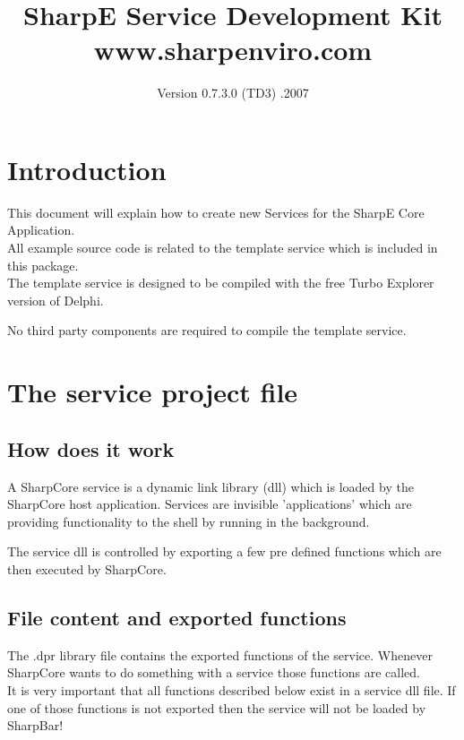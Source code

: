 \documentclass[a4paper]{article}
\begin{document}
\title{ {\bf SharpE} \break \break
{\bf Service Development Kit }\break 
\normalsize www.sharpenviro.com}
\date{Version 0.7.3.0 (TD3) \break {}.2007}
\maketitle
\thispagestyle{empty}
\tableofcontents
\thispagestyle{empty}
\newpage
\setcounter{page}{1}


\section{Introduction}
  This document will explain how to create new Services for the SharpE Core Application.\\
  All example source code is related to the template service which is included in this package.\\
  The template service is designed to be compiled with the free Turbo Explorer version of Delphi.

  \medskip
  No third party components are required to compile the template service.
  
\section{The service project file}
\subsection{How does it work}
  A SharpCore service is a dynamic link library (dll) which is loaded by the SharpCore host application. Services are invisible 'applications' which are providing functionality to the shell by running in the background.
  
  The service dll is controlled by exporting a few pre defined functions which are then executed by SharpCore.

\subsection{File content and exported functions}
  The .dpr library file contains the exported functions of the service. Whenever SharpCore wants to do something with a service those functions are called. \\
  It is very important that all functions described below exist in a service dll file. If one of those functions is not exported then the service will not be loaded by SharpBar! 
\end{document}
